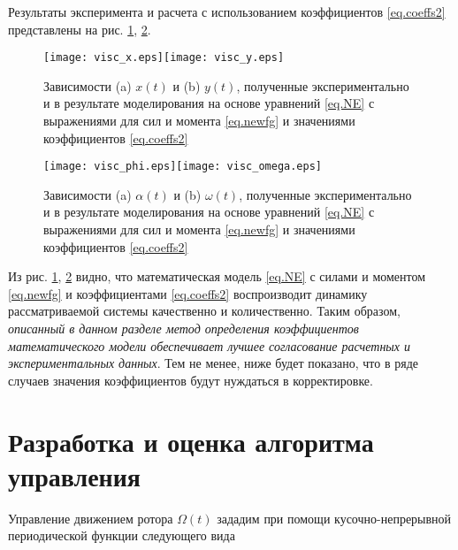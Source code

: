Результаты эксперимента и расчета с использованием коэффициентов \eqref{eq.coeffs2} представлены на рис. \ref{fig.xy1}, \ref{fig.phiOmega1}.

\begin{figure}[h!]
	\centering
	\texttt{[image: visc\_x.eps]}\hspace{20mm}\texttt{[image: visc\_y.eps]}
	\caption{Зависимости (a) $x(t)$ и (b) $y(t)$, полученные экспериментально и в результате моделирования на основе уравнений \eqref{eq.NE} с выражениями для сил и момента \eqref{eq.newfg} и значениями коэффициентов \eqref{eq.coeffs2}}\label{fig.xy1}
\end{figure}

\begin{figure}[h!]
	\centering
	\texttt{[image: visc\_phi.eps]}\hspace{20mm}\texttt{[image: visc\_omega.eps]}
	\caption{Зависимости (a) $\alpha(t)$ и (b) $\omega(t)$, полученные экспериментально и в результате моделирования на основе уравнений \eqref{eq.NE} с выражениями для сил и момента \eqref{eq.newfg} и значениями коэффициентов \eqref{eq.coeffs2}}\label{fig.phiOmega1}
\end{figure}

Из рис. \ref{fig.xy1}, \ref{fig.phiOmega1} видно, что математическая модель \eqref{eq.NE} с силами и моментом \eqref{eq.newfg} и коэффициентами \eqref{eq.coeffs2} воспроизводит динамику рассматриваемой системы качественно и количественно. Таким образом, \textit{описанный в данном разделе метод определения коэффициентов математического модели обеспечивает лучшее согласование расчетных и экспериментальных данных}. Тем не менее, ниже будет показано, что в ряде случаев значения коэффициентов будут нуждаться в корректировке.



\section{Разработка и оценка алгоритма управления}

Управление движением ротора $\Omega(t)$ зададим при помощи кусочно-непрерывной периодической функции следующего вида


